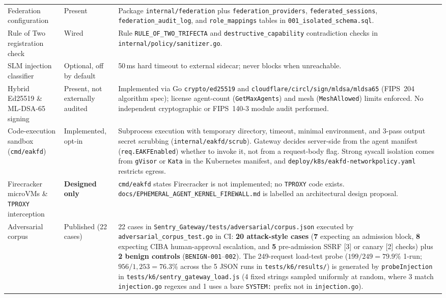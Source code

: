 \documentclass[11pt, a4paper]{article}
\begin{document}
\begin{small}
\begin{longtable}{@{} p{3.6cm} p{2.6cm} p{9.2cm} @{}}
\addlinespace
Federation configuration & Present & Package \texttt{internal/federation} plus \texttt{federation\_providers}, \texttt{federated\_sessions}, \texttt{federation\_audit\_log}, and \texttt{role\_mappings} tables in \texttt{001\_isolated\_schema.sql}. \\
\addlinespace
Rule of Two registration check & Wired & Rule \texttt{RULE\_OF\_TWO\_TRIFECTA} and \texttt{destructive\_capability} contradiction checks in \texttt{internal/policy/sanitizer.go}. \\
\addlinespace
SLM injection classifier & Optional, off by default & 50\,ms hard timeout to external sidecar; never blocks when unreachable. \\
\addlinespace
Hybrid Ed25519 \& ML-DSA-65 signing & Present, not externally audited & Implemented via Go \texttt{crypto/ed25519} and \texttt{cloudflare/circl/sign/mldsa/mldsa65} (FIPS~204 algorithm spec); license agent-count (\texttt{GetMaxAgents}) and mesh (\texttt{MeshAllowed}) limits enforced. No independent cryptographic or FIPS~140-3 module audit performed. \\
\addlinespace
Code-execution sandbox (\texttt{cmd/eakfd}) & Implemented, opt-in & Subprocess execution with temporary directory, timeout, minimal environment, and 3-pass output secret scrubbing (\texttt{internal/eakfd/scrub}). Gateway decides server-side from the agent manifest (\texttt{req.EAKFEnabled}) whether to invoke it, not from a request-body flag. Strong syscall isolation comes from \texttt{gVisor} or \texttt{Kata} in the Kubernetes manifest, and \texttt{deploy/k8s/eakfd-networkpolicy.yaml} restricts egress. \\
\addlinespace
Firecracker microVMs \& \texttt{TPROXY} interception & \textbf{Designed only} & \texttt{cmd/eakfd} states Firecracker is not implemented; no \texttt{TPROXY} code exists. \texttt{docs/EPHEMERAL\_AGENT\_KERNEL\_FIREWALL.md} is labelled an architectural design proposal. \\
\addlinespace
Adversarial corpus & Published (22 cases) & 22 cases in \texttt{Sentry\_Gateway/tests/adversarial/corpus.json} executed by \texttt{adversarial\_corpus\_test.go} in CI: \textbf{20 attack-style cases} (\textbf{7} expecting an admission block, \textbf{8} expecting CIBA human-approval escalation, and \textbf{5} pre-admission SSRF [3] or canary [2] checks) plus \textbf{2 benign controls} (\texttt{BENIGN-001}--\texttt{002}). The 249-request load-test probe ($199/249 = 79.9\%$ 1-run; $956/1{,}253 = 76.3\%$ across the 5 JSON runs in \texttt{tests/k6/results/}) is generated by \texttt{probeInjection} in \texttt{tests/k6/sentry\_gateway\_load.js} (4 fixed strings sampled uniformly at random, where 3 match \texttt{injection.go} regexes and 1 uses a bare \texttt{SYSTEM:} prefix not in \texttt{injection.go}). \\

\end{longtable}
\end{small}
\end{document}
